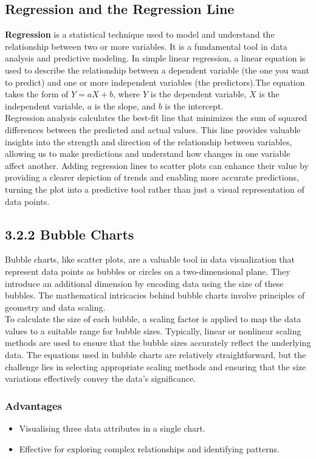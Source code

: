 \documentclass{article}\usepackage[]{graphicx}\usepackage[]{xcolor}
\begin{document}
\subsection{Regression and the Regression Line}
\textbf{Regression} is a statistical technique used to model and understand the relationship between two or more variables. It is a fundamental tool in data analysis and predictive modeling. In simple linear regression, a linear equation is used to describe the relationship between a dependent variable (the one you want to predict) and one or more independent variables (the predictors).The equation takes the form of \(Y = aX + b\), where \(Y\) is the dependent variable, \(X\) is the independent variable, \(a\) is the slope, and \(b\) is the intercept.\\
Regression analysis calculates the best-fit line that minimizes the sum of squared differences between the predicted and actual values. This line provides valuable insights into the strength and direction of the relationship between variables, allowing us to make predictions and understand how changes in one variable affect another. Adding regression lines to scatter plots can enhance their value by providing a clearer depiction of trends and enabling more accurate predictions, turning the plot into a predictive tool rather than just a visual representation of data points.


\subsection{3.2.2 Bubble Charts}
Bubble charts, like scatter plots, are a valuable tool in data visualization that represent data points as bubbles or circles on a two-dimensional plane. They introduce an additional dimension by encoding data using the size of these bubbles. The mathematical intricacies behind bubble charts involve principles of geometry and data scaling.\\
To calculate the size of each bubble, a scaling factor is applied to map the data values to a suitable range for bubble sizes. Typically, linear or nonlinear scaling methods are used to ensure that the bubble sizes accurately reflect the underlying data. The equations used in bubble charts are relatively straightforward, but the challenge lies in selecting appropriate scaling methods and ensuring that the size variations effectively convey the data's significance. 

\subsubsection{Advantages}
\begin{itemize}
    \item Visualising three data attributes in a single chart.
    \item Effective for exploring complex relationships and identifying patterns. 
\end{itemize}
\end{document}
